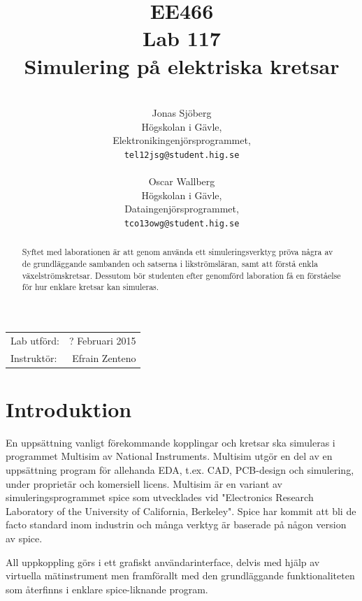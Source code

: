 \documentclass[11pt,a4paper]{article}
\title{EE466 \\ Lab 117 \\ Simulering på elektriska kretsar}
\author{\\
  Jonas Sjöberg\\
  Högskolan i Gävle,\\
  Elektronikingenjörsprogrammet,\\
  \texttt{tel12jsg@student.hig.se}\\
  \\
  Oscar Wallberg\\
  Högskolan i Gävle,\\
  Dataingenjörsprogrammet,\\
  \texttt{tco13owg@student.hig.se}\\}
\date{}
\begin{document}
\maketitle

\begin{center}
    \begin{tabular}{l r}
        Lab utförd: & ? Februari 2015 \\
        Instruktör: & Efrain Zenteno
    \end{tabular}
\end{center}

\begin{abstract}
    Syftet med laborationen är att genom använda ett simuleringsverktyg pröva
    några av de grundläggande sambanden och satserna i likströmsläran, samt att
    förstå enkla växelströmskretsar. Dessutom bör studenten efter genomförd
    laboration få en förståelse för hur enklare kretsar kan simuleras.
\end{abstract}

\newpage

{
    \setcounter{tocdepth}{3}
    \tableofcontents
}

\newpage

\section{Introduktion}\label{setup}
En uppsättning vanligt förekommande kopplingar och kretsar ska simuleras i
programmet Multisim av National Instruments. Multisim utgör en del av en uppsättning program
för allehanda EDA, t.ex. CAD, PCB-design och simulering, under proprietär och
komersiell licens. Multisim är en variant av simuleringsprogrammet spice som
utvecklades vid "Electronics Research Laboratory of the University of
California, Berkeley". Spice har kommit att bli de facto standard inom
industrin och många verktyg är baserade på någon version av spice.

All uppkoppling görs i ett grafiskt användarinterface, delvis med hjälp av
virtuella mätinstrument men framförallt med den grundläggande funktionaliteten
som återfinns i enklare spice-liknande program.
\end{document}
